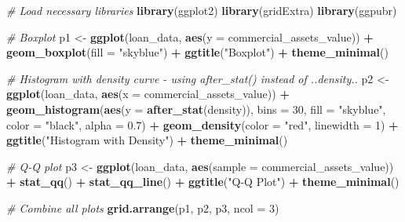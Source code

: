 \documentclass[
]{article}
\newenvironment{Shaded}{\begin{snugshade}}{\end{snugshade}}
\newcommand{\AttributeTok}[1]{\textcolor[rgb]{0.13,0.29,0.53}{#1}}
\newcommand{\CommentTok}[1]{\textcolor[rgb]{0.56,0.35,0.01}{\textit{#1}}}
\newcommand{\DecValTok}[1]{\textcolor[rgb]{0.00,0.00,0.81}{#1}}
\newcommand{\FloatTok}[1]{\textcolor[rgb]{0.00,0.00,0.81}{#1}}
\newcommand{\FunctionTok}[1]{\textcolor[rgb]{0.13,0.29,0.53}{\textbf{#1}}}
\newcommand{\NormalTok}[1]{#1}
\newcommand{\OtherTok}[1]{\textcolor[rgb]{0.56,0.35,0.01}{#1}}
\newcommand{\SpecialCharTok}[1]{\textcolor[rgb]{0.81,0.36,0.00}{\textbf{#1}}}
\newcommand{\StringTok}[1]{\textcolor[rgb]{0.31,0.60,0.02}{#1}}
\begin{document}
\begin{Shaded}
\begin{Highlighting}[]
\CommentTok{\# Load necessary libraries}
\FunctionTok{library}\NormalTok{(ggplot2)}
\FunctionTok{library}\NormalTok{(gridExtra)}
\FunctionTok{library}\NormalTok{(ggpubr)}

\CommentTok{\# Boxplot}
\NormalTok{p1 }\OtherTok{\textless{}{-}} \FunctionTok{ggplot}\NormalTok{(loan\_data, }\FunctionTok{aes}\NormalTok{(}\AttributeTok{y =}\NormalTok{ commercial\_assets\_value)) }\SpecialCharTok{+}
  \FunctionTok{geom\_boxplot}\NormalTok{(}\AttributeTok{fill =} \StringTok{"skyblue"}\NormalTok{) }\SpecialCharTok{+}
  \FunctionTok{ggtitle}\NormalTok{(}\StringTok{"Boxplot"}\NormalTok{) }\SpecialCharTok{+}
  \FunctionTok{theme\_minimal}\NormalTok{()}

\CommentTok{\# Histogram with density curve {-} using after\_stat() instead of ..density..}
\NormalTok{p2 }\OtherTok{\textless{}{-}} \FunctionTok{ggplot}\NormalTok{(loan\_data, }\FunctionTok{aes}\NormalTok{(}\AttributeTok{x =}\NormalTok{ commercial\_assets\_value)) }\SpecialCharTok{+}
  \FunctionTok{geom\_histogram}\NormalTok{(}\FunctionTok{aes}\NormalTok{(}\AttributeTok{y =} \FunctionTok{after\_stat}\NormalTok{(density)), }\AttributeTok{bins =} \DecValTok{30}\NormalTok{, }\AttributeTok{fill =} \StringTok{"skyblue"}\NormalTok{, }\AttributeTok{color =} \StringTok{"black"}\NormalTok{, }\AttributeTok{alpha =} \FloatTok{0.7}\NormalTok{) }\SpecialCharTok{+}
  \FunctionTok{geom\_density}\NormalTok{(}\AttributeTok{color =} \StringTok{"red"}\NormalTok{, }\AttributeTok{linewidth =} \DecValTok{1}\NormalTok{) }\SpecialCharTok{+}
  \FunctionTok{ggtitle}\NormalTok{(}\StringTok{"Histogram with Density"}\NormalTok{) }\SpecialCharTok{+}
  \FunctionTok{theme\_minimal}\NormalTok{()}

\CommentTok{\# Q{-}Q plot}
\NormalTok{p3 }\OtherTok{\textless{}{-}} \FunctionTok{ggplot}\NormalTok{(loan\_data, }\FunctionTok{aes}\NormalTok{(}\AttributeTok{sample =}\NormalTok{ commercial\_assets\_value)) }\SpecialCharTok{+}
  \FunctionTok{stat\_qq}\NormalTok{() }\SpecialCharTok{+}
  \FunctionTok{stat\_qq\_line}\NormalTok{() }\SpecialCharTok{+}
  \FunctionTok{ggtitle}\NormalTok{(}\StringTok{"Q{-}Q Plot"}\NormalTok{) }\SpecialCharTok{+}
  \FunctionTok{theme\_minimal}\NormalTok{()}

\CommentTok{\# Combine all plots}
\FunctionTok{grid.arrange}\NormalTok{(p1, p2, p3, }\AttributeTok{ncol =} \DecValTok{3}\NormalTok{)}
\end{Highlighting}
\end{Shaded}
\end{document}
